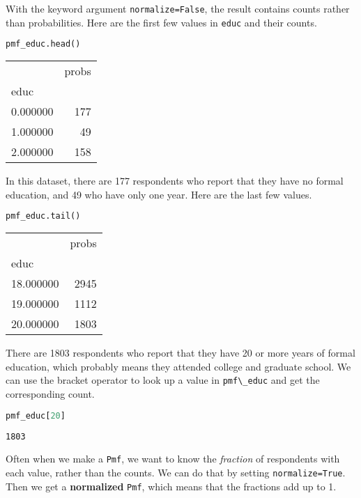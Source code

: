 With the keyword argument \passthrough{\lstinline!normalize=False!}, the
result contains counts rather than probabilities. Here are the first few
values in \passthrough{\lstinline!educ!} and their counts.

\begin{lstlisting}[language=Python,style=source]
pmf_educ.head()
\end{lstlisting}

\begin{tabular}{lr}
\midrule
 & probs \\
educ &  \\
\midrule
0.000000 & 177 \\
1.000000 & 49 \\
2.000000 & 158 \\
\midrule
\end{tabular}

In this dataset, there are 177 respondents who report that they have no
formal education, and 49 who have only one year. Here are the last few
values.

\begin{lstlisting}[language=Python,style=source]
pmf_educ.tail()
\end{lstlisting}

\begin{tabular}{lr}
\midrule
 & probs \\
educ &  \\
\midrule
18.000000 & 2945 \\
19.000000 & 1112 \\
20.000000 & 1803 \\
\midrule
\end{tabular}

There are 1803 respondents who report that they have 20 or more years of
formal education, which probably means they attended college and
graduate school. We can use the bracket operator to look up a value in
\passthrough{\lstinline!pmf\_educ!} and get the corresponding count.

\begin{lstlisting}[language=Python,style=source]
pmf_educ[20]
\end{lstlisting}

\begin{lstlisting}[style=output]
1803
\end{lstlisting}

Often when we make a \passthrough{\lstinline!Pmf!}, we want to know the
\emph{fraction} of respondents with each value, rather than the counts.
We can do that by setting \passthrough{\lstinline!normalize=True!}. Then
we get a \textbf{normalized} \passthrough{\lstinline!Pmf!}, which means
that the fractions add up to 1.

